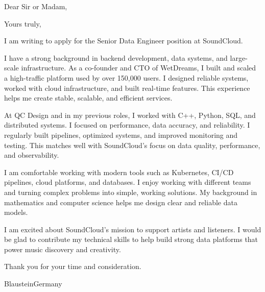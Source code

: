 \documentclass[11pt,a4paper,sans]{moderncv}        %
\begin{document}
	\clearpage
	\opening{Dear Sir or Madam,}
	\closing{Yours truly,}
	\makelettertitle
	
	I am writing to apply for the Senior Data Engineer position at SoundCloud.

I have a strong background in backend development, data systems, and large-scale infrastructure. As a co-founder and CTO of WetDreams, I built and scaled a high-traffic platform used by over 150,000 users. I designed reliable systems, worked with cloud infrastructure, and built real-time features. This experience helps me create stable, scalable, and efficient services.

At QC Design and in my previous roles, I worked with C++, Python, SQL, and distributed systems. I focused on performance, data accuracy, and reliability. I regularly built pipelines, optimized systems, and improved monitoring and testing. This matches well with SoundCloud’s focus on data quality, performance, and observability.

I am comfortable working with modern tools such as Kubernetes, CI/CD pipelines, cloud platforms, and databases. I enjoy working with different teams and turning complex problems into simple, working solutions. My background in mathematics and computer science helps me design clear and reliable data models.

I am excited about SoundCloud’s mission to support artists and listeners. I would be glad to contribute my technical skills to help build strong data platforms that power music discovery and creativity.

Thank you for your time and consideration.
	
	\title{}
	\address{Erhard-Grözinger-Straße, 75}{Blaustein}{Germany}
	\makeletterclosing
	\name{}{}
\end{document}
